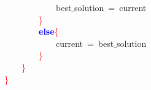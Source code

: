 \mbox{}\ \ \ \ \ \ \ \ \ \ \ \ best$\_$solution\ \textcolor{BrickRed}{=}\ current \\
\mbox{}\ \ \ \ \ \ \ \ \textcolor{Red}{\}} \\
\mbox{}\ \ \ \ \ \ \ \ \textbf{\textcolor{Blue}{else}}\textcolor{Red}{\{} \\
\mbox{}\ \ \ \ \ \ \ \ \ \ \ \ current\ \textcolor{BrickRed}{=}\ best$\_$solution \\
\mbox{}\ \ \ \ \ \ \ \ \textcolor{Red}{\}} \\
\mbox{}\ \ \ \ \textcolor{Red}{\}} \\
\mbox{}\textcolor{Red}{\}} \\
\mbox{}

